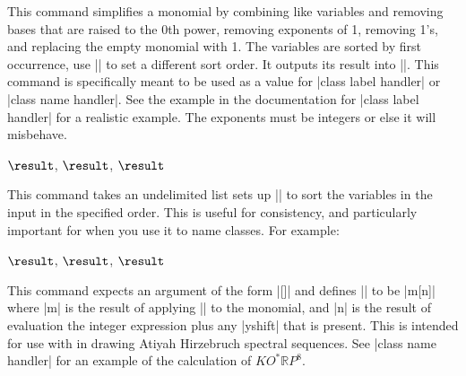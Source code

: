 \begin{sseqdata}[name = basic, cohomological Serre grading]
\begin{command}{\SseqNormalizeMonomial}
This command simplifies a monomial by combining like variables and removing bases that are raised to the 0th power, removing exponents of 1, removing 1's, and replacing the empty monomial with 1. The variables are sorted by first occurrence, use |\SseqNormalizeMonomialSetVariables| to set a different sort order. It outputs its result into |\result|. This command is specifically meant to be used as a value for |class label handler| or |class name handler|. See the example in the documentation for |class label handler| for a realistic example. The exponents must be integers or else it will misbehave.
\begin{codeexample}[]
 $\result$, \quad
{} $\result$, \quad
{} $\result$
\end{codeexample}
\end{command}

\begin{command}{\SseqNormalizeMonomialSetVariables}
This command takes an undelimited list sets up |\SseqNormalizeMonomial| to sort the variables in the input in the specified order. This is useful for consistency, and particularly important for when you use it to name classes.  For example:
\begin{codeexample}[]
 $\result$, \quad
{} $\result$, \quad
{} $\result$
\end{codeexample}
\SseqNormalizeMonomialSetVariables{}
\end{command}


\begin{command}{\SseqAHSSNameHandler}
This command expects an argument of the form |[]| and defines |\result| to be |m[n]| where |m| is the result of applying |\SseqNormalizeMonomial| to the monomial, and |n| is the result of evaluation the integer expression plus any |yshift| that is present. This is intended for use with in drawing Atiyah Hirzebruch spectral sequences. See |class name handler| for an example of the calculation of $KO^*\mathbb{R}P^8$.
\end{command}


\end{sseqdata}
